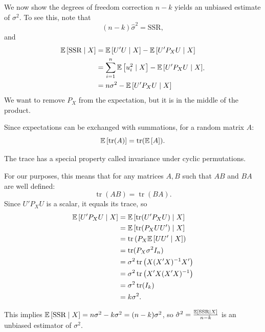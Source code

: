 \begin{proposition}
	We now show the degrees of freedom correction $n-k$ yields an unbiased estimate of $\sigma^2$. To see this, note that \[
		(n-k) \hat{\sigma}^2 = \text{SSR}
	,\] and
	\[
		\begin{aligned}
			\mathbb{E}\left[\text{SSR} \mid X\right]
			&= \mathbb{E}\left[U'U \mid X\right] - \mathbb{E}\left[U' P_X U \mid X\right] \\
			&= \sum_{i=1}^{n} \mathbb{E}\left[u_i^2 \mid X\right] - \mathbb{E}\left[U' P_X U \mid X\right] \\
			&= n\sigma^2 - \mathbb{E}\left[U' P_X U \mid X\right]
		\end{aligned}
	.\]
	We want to remove $P_X$ from the expectation, but it is in the middle of the product.

	Since expectations can be exchanged with summations, for a random matrix $A$: \[
		\mathbb{E}\left[\operatorname{tr}(A)\right] = \operatorname{tr}(\mathbb{E}\left[A\right] )
	.\] 
	
	The trace has a special property called invariance under cyclic permutations.
	
	For our purposes, this means that for any matrices $A, B$ such that $AB$ and $BA$ are well defined: \[
		\operatorname{tr}(AB) = \operatorname{tr}(BA)
	.\] 
	Since $U' P_X U$ is a scalar, it equals its trace, so \begin{align*}
		\mathbb{E}\left[U' P_X U \mid X\right] &= \mathbb{E}\left[\operatorname{tr}(U' P_X U) \mid X\right] \\ &= \mathbb{E}\left[\operatorname{tr}(P_X U U') \mid X\right] \\
									   &= \operatorname{tr}\left( P_X \mathbb{E}\left[UU' \mid X\right]  \right) \\
									   &= \operatorname{tr}(P_X \sigma^2 I_n) \\ &= \sigma^2 \operatorname{tr}\left( X(X'X)^{-1}X' \right)  \\ &= \sigma^2 \operatorname{tr}\left( X'X (X'X)^{-1} \right) \\ &= \sigma^2 \operatorname{tr}(I_k) \\ &= k\sigma^2
	.\end{align*} 
	
	This implies $\mathbb{E}\left[\text{SSR} \mid X\right] = n\sigma^2 - k\sigma^2 = (n-k)\sigma^2$, so $ \hat{\sigma}^2 = \frac{\mathbb{E}\left[\operatorname{SSR}\mid X\right] }{n-k}$ is an unbiased estimator of $\sigma^2$.
\end{proposition}

